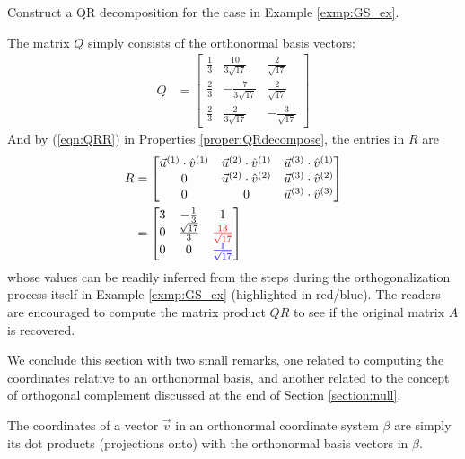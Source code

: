 \begin{exmp}
\label{exmp:QRdecom}
Construct a QR decomposition for the case in Example \ref{exmp:GS_ex}.
\end{exmp}
\begin{solution}
The matrix $Q$ simply consists of the orthonormal basis vectors:
\begin{align*}
Q &= 
\begin{bmatrix}
\frac{1}{3} & \frac{10}{3\sqrt{17}} & \frac{2}{\sqrt{17}} \\
\frac{2}{3} & -\frac{7}{3\sqrt{17}} & \frac{2}{\sqrt{17}} \\
\frac{2}{3} & \frac{2}{3\sqrt{17}} & -\frac{3}{\sqrt{17}}
\end{bmatrix}
\end{align*}
And by (\ref{eqn:QRR}) in Properties \ref{proper:QRdecompose}, the entries in $R$ are
\begin{align*}
R &= 
\begin{bmatrix}
\vec{u}^{(1)} \cdot \hat{v}^{(1)} & \vec{u}^{(2)} \cdot \hat{v}^{(1)} & \vec{u}^{(3)} \cdot \hat{v}^{(1)} \\
0 & \vec{u}^{(2)} \cdot \hat{v}^{(2)} & \vec{u}^{(3)} \cdot \hat{v}^{(2)} \\
0 & 0 & \vec{u}^{(3)} \cdot \hat{v}^{(3)}
\end{bmatrix}  \\
&= 
\begin{bmatrix}
3 & -\frac{1}{3} & 1 \\
0 & \frac{\sqrt{17}}{3} & \textcolor{red}{\frac{13}{\sqrt{17}}}  \\
0 & 0 & \textcolor{blue}{\frac{1}{\sqrt{17}}} \\
\end{bmatrix} 
\end{align*}
whose values can be readily inferred from the steps during the orthogonalization process itself in Example \ref{exmp:GS_ex} (highlighted in red/blue). The readers are encouraged to compute the matrix product $QR$ to see if the original matrix $A$ is recovered.
\end{solution}
We conclude this section with two small remarks, one related to computing the coordinates relative to an orthonormal basis, and another related to the concept of orthogonal complement discussed at the end of Section \ref{section:null}.
\begin{proper}
\label{proper:orthocoords}
The coordinates of a vector $\vec{v}$ in an orthonormal coordinate system $\beta$ are simply its dot products (projections onto) with the orthonormal basis vectors in $\beta$.
\end{proper}
